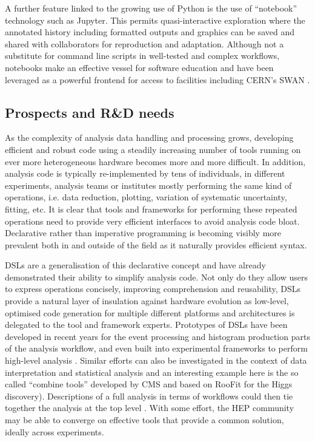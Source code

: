\documentclass[11pt,a4paper]{article}
\begin{document}
A further feature linked to the growing use of Python is the use of
``notebook'' technology such as Jupyter. This permits quasi-interactive
exploration where the annotated history including formatted outputs and
graphics can be saved and shared with collaborators for reproduction and
adaptation. Although not a substitute for command line scripts in
well-tested and complex workflows, notebooks make an effective vessel
for software education and have been leveraged as a powerful frontend
for access to facilities including CERN's SWAN \cite{Ref20}.

\hypertarget{prospects-and-rd-needs}{%
\subsection{Prospects and R\&D needs}\label{prospects-and-rd-needs}}

As the complexity of analysis data handling and processing grows,
developing efficient and robust code using a steadily increasing number
of tools running on ever more heterogeneous hardware becomes more and
more difficult. In addition, analysis code is typically re-implemented by
tens of individuals, in different experiments, analysis teams or
institutes mostly performing the same kind of operations, i.e. data
reduction, plotting, variation of systematic uncertainty, fitting, etc.
It is clear that tools and frameworks for performing these repeated
operations need to provide very efficient interfaces to avoid analysis
code bloat. Declarative rather than imperative programming is becoming
visibly more prevalent both in and outside of the field as it naturally
provides efficient syntax.

DSLs are a generalisation of this declarative concept and have already
demonstrated their ability to simplify analysis code. Not only do %
they allow users to express operations concisely, improving
comprehension and reusability, DSLs provide a natural layer of
insulation against hardware evolution as low-level, optimised code
generation for multiple different platforms and architectures is
delegated to the tool and framework experts. Prototypes of DSLs have
been developed in recent years \cite{Ref10} for the event processing and
histogram production parts of the analysis workflow, and even built into
experimental frameworks to perform high-level analysis \cite{Ref19}. Similar
efforts can also be investigated in the context of data interpretation
and statistical analysis and an interesting example here is the so
called ``combine tools'' developed by CMS and based on RooFit for the
Higgs discovery). Descriptions of a full analysis in terms of %
workflows could then tie together the analysis at the top level \cite{Ref18,Ref21}. With some effort, the HEP community may be able to converge on
effective tools that provide a common solution, ideally across
experiments.
\end{document}
